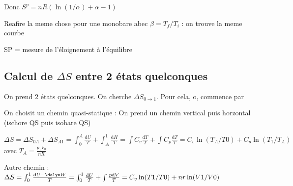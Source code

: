 \documentclass[french]{yLectureNote}
\newcommand{\dd}[0]{\mathrm{d}}
\begin{document}
Donc $S^p = nR(\ln(1/\alpha)+\alpha-1)$

Reafire la meme chose pour une monobare abec $\beta = T_f/T_i$ : on trouve la meme courbe

SP = mesure de l'éloignement à l'équilibre

\subsection{Calcul de $\Delta S$ entre 2 états quelconques}
On prend 2 états quelconques. On cherche $\Delta S_{0\to1}$. Pour cela, o, commence par

On choisit un chemin quasi-statique : On prend un chemin vertical puis horzontal (ischore QS puis isobare QS)

$\Delta S = \Delta S_{0A} + \Delta S_{A1} = \int_0^A \frac{\dd U}{T} + \int_A^1 \frac{\dd H}{T} = \int C_v \frac{\dd T}{T} + \int C_p \frac{\dd T}{T} = C_v \ln(T_A/T0)+C_p \ln(T_1/T_A)$
avec $T_A = \frac{p_1V_0}{nR}$

Autre chemin : $\Delta S = \int_0^1 \frac{\dd U-\delya W}{T} = \int_0^1 \frac{\dd U}{T} + \int \frac{p\dd V}{T} = C_v\ln(T1/T0)+nr\ln(V1/V0)$
\end{document}

